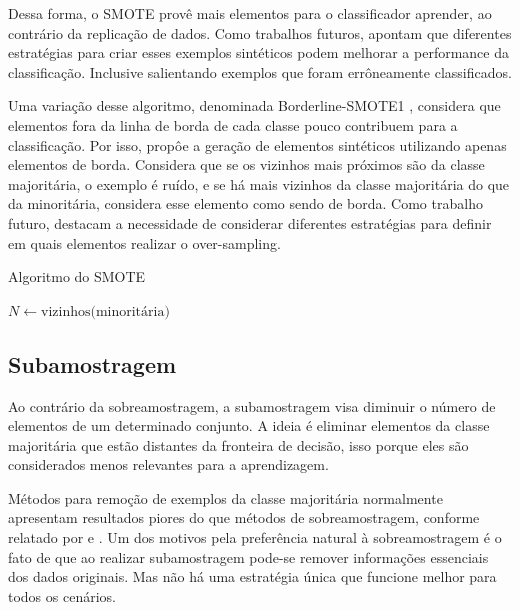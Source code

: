 Dessa forma, o SMOTE provê mais elementos para o classificador aprender, ao contrário da replicação de dados. Como trabalhos futuros,  apontam que diferentes estratégias para criar esses exemplos sintéticos podem melhorar a performance da classificação. Inclusive salientando exemplos que foram errôneamente classificados.

Uma variação desse algoritmo, denominada Borderline-SMOTE1 \cite{Han2005}, considera que elementos fora da linha de borda de cada classe pouco contribuem para a classificação. Por isso, propôe a geração de elementos sintéticos utilizando apenas elementos de borda. Considera que se os vizinhos mais próximos são da classe majoritária, o exemplo é ruído, e se há mais vizinhos da classe majoritária do que da minoritária, considera esse elemento como sendo de borda. Como trabalho futuro, destacam a necessidade de considerar diferentes estratégias para definir em quais elementos realizar o over-sampling.

\begin{algorithm}[H]
  \caption{Algoritmo do SMOTE}
  \label{alg:smote}
  \SetAlgoLined
  $N \gets \text{vizinhos(minoritária)}$\;
\end{algorithm}

\subsection{Subamostragem}

Ao contrário da sobreamostragem, a subamostragem visa diminuir o número de elementos de um determinado conjunto. A ideia é eliminar elementos da classe majoritária que estão distantes da fronteira de decisão, isso porque eles são considerados menos relevantes para a aprendizagem.

Métodos para remoção de exemplos da classe majoritária normalmente apresentam resultados piores do que métodos de sobreamostragem, conforme relatado por  e \cite{Japkowicz2002}. Um dos motivos pela preferência natural à sobreamostragem é o fato de que ao realizar subamostragem pode-se remover informações essenciais dos dados originais. Mas não há uma estratégia única que funcione melhor para todos os cenários.

